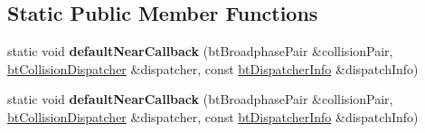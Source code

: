 \subsection*{Static Public Member Functions}
\begin{DoxyCompactItemize}
\item 
\mbox{\label{classbtCollisionDispatcher_a70f1edf7c1f94778d350e6d19b66fa94}} 
static void {\bfseries default\+Near\+Callback} (bt\+Broadphase\+Pair \&collision\+Pair, \hyperlink{classbtCollisionDispatcher}{bt\+Collision\+Dispatcher} \&dispatcher, const \hyperlink{structbtDispatcherInfo}{bt\+Dispatcher\+Info} \&dispatch\+Info)
\item 
\mbox{\label{classbtCollisionDispatcher_a9050fb14476263c77c3790652af521df}} 
static void {\bfseries default\+Near\+Callback} (bt\+Broadphase\+Pair \&collision\+Pair, \hyperlink{classbtCollisionDispatcher}{bt\+Collision\+Dispatcher} \&dispatcher, const \hyperlink{structbtDispatcherInfo}{bt\+Dispatcher\+Info} \&dispatch\+Info)
\end{DoxyCompactItemize}
